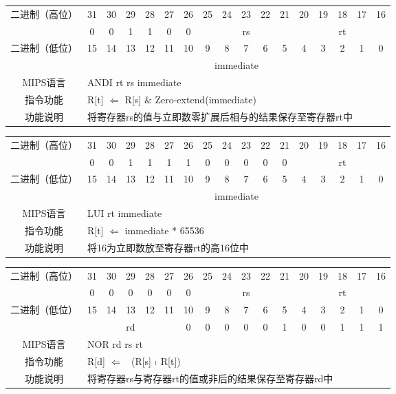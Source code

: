 \begin{table}
\begin{tabular}{|c|c|c|c|c|c|c|c|c|c|c|c|c|c|c|c|c|}
\hline
\multirow{2}{*}{二进制（高位）} &
31&30&29&28&27&26&25&24&23&22&21&20&19&18&17&16\\
\cline{2-17}
&
0&0&1&1&0&
0&
\multicolumn{5}{c|}{rs}&
\multicolumn{5}{c|}{rt}\\
\hline
\multirow{2}{*}{二进制（低位）} &
15&14&13&12&11&10&9&8&7&6&5&4&3&2&1&0\\
\cline{2-17}
&
\multicolumn{16}{c|}{immediate}\\
\hline
MIPS语言&
\multicolumn{16}{l|}{ANDI rt rs immediate}\\
\hline
指令功能&
\multicolumn{16}{l|}{R[t] $\Leftarrow$ R[s] $\&$ Zero-extend(immediate)}\\
\hline
功能说明&
\multicolumn{16}{l|}{将寄存器rs的值与立即数零扩展后相与的结果保存至寄存器rt中}\\
\hline
\end{tabular}
\end{table}

\begin{table}
\begin{tabular}{|c|c|c|c|c|c|c|c|c|c|c|c|c|c|c|c|c|}
\hline
\multirow{2}{*}{二进制（高位）} &
31&30&29&28&27&26&25&24&23&22&21&20&19&18&17&16\\
\cline{2-17}
&
0&0&1&1&1&
1&0&0&0&0&
0&
\multicolumn{5}{c|}{rt}\\
\hline
\multirow{2}{*}{二进制（低位）} &
15&14&13&12&11&10&9&8&7&6&5&4&3&2&1&0\\
\cline{2-17}
&
\multicolumn{16}{c|}{immediate}\\
\hline
MIPS语言&
\multicolumn{16}{l|}{LUI rt immediate}\\
\hline
指令功能&
\multicolumn{16}{l|}{R[t] $\Leftarrow$ immediate * 65536}\\
\hline
功能说明&
\multicolumn{16}{l|}{将16为立即数放至寄存器rt的高16位中}\\
\hline
\end{tabular}
\end{table}

\begin{table}
\begin{tabular}{|c|c|c|c|c|c|c|c|c|c|c|c|c|c|c|c|c|}
\hline
\multirow{2}{*}{二进制（高位）} &
31&30&29&28&27&26&25&24&23&22&21&20&19&18&17&16\\
\cline{2-17}
&
0&0&0&0&0&
0&
\multicolumn{5}{c|}{rs}&
\multicolumn{5}{c|}{rt}\\
\hline
\multirow{2}{*}{二进制（低位）} &
15&14&13&12&11&10&9&8&7&6&5&4&3&2&1&0\\
\cline{2-17}
&
\multicolumn{5}{c|}{rd}&
0&0&0&0&0&
1&0&0&1&1&
1\\
\hline
MIPS语言&
\multicolumn{16}{l|}{NOR rd rs rt}\\
\hline
指令功能&
\multicolumn{16}{l|}{R[d] $\Leftarrow$ ~(R[s] $\shortmid$ R[t])}\\
\hline
功能说明&
\multicolumn{16}{l|}{将寄存器rs与寄存器rt的值或非后的结果保存至寄存器rd中}\\
\hline
\end{tabular}
\end{table}

